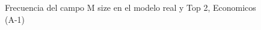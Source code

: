 \begin{figure}[H]
    \centering
    
    \caption{Frecuencia del campo M size en el modelo real y Top 2, Economicos (A-1)}
    \label{frecuency-M Size-top2}
\end{figure}